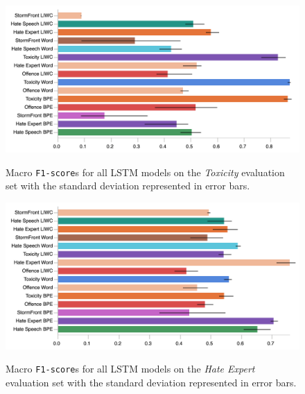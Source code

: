 \begin{figure}
\begin{minipage}{\textwidth}
    \centering
    \includegraphics[width=\textwidth]{all_lstm_wulczyn_test.pdf}
    \caption{Macro \texttt{F1-score}s for all LSTM models on the \textit{Toxicity} evaluation set with the standard deviation represented in error bars.}
    \label{fig:wulczyn_lstm_test}
  \vfill
    \includegraphics[width=\textwidth]{all_lstm_waseem_test.pdf}
    \caption{Macro \texttt{F1-score}s for all LSTM models on the \textit{Hate Expert} evaluation set with the standard deviation represented in error bars.}
    \label{fig:waseem_lstm_test}
\end{minipage}
\end{figure}

